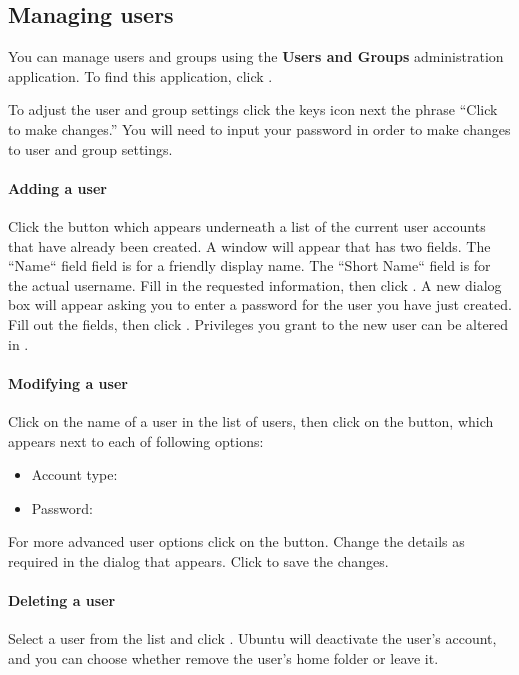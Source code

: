 
\subsection{Managing users}
\label{sec:security:managing-users}

You can manage users and groups using the \textbf{Users and Groups} administration application.  To find this application, click .

To adjust the user and group settings click the keys icon next the phrase ``Click to make changes.'' You will need to input your password in order to make changes to user and group settings.

\paragraph{Adding a user}
Click the  button which appears underneath a list of the current user accounts that have already been created. A window will appear that has two fields. The ``Name`` field field is for a friendly display name. The ``Short Name`` field is for the actual username. Fill in the requested information, then click . A new dialog box will appear asking you to enter a password for the user you have just created. Fill out the fields, then click . Privileges you grant to the new user can be altered in .

\paragraph{Modifying a user}
Click on the name of a user in the list of users, then click on the  button, which appears next to each of following options:
\begin{itemize}
  \item Account type:
  \item Password:
\end{itemize}
For more advanced user options click on the  button. Change the details as required in the dialog that appears. Click  to save the changes.

\paragraph{Deleting a user}
Select a user from the list and click . Ubuntu will deactivate the user's account, and you can choose whether remove the user's home folder or leave it.

